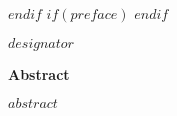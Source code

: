 \documentclass[12pt,letterpaper,oneside]{report}
\begin{document}
 \def\ackhead{\chapter*{Acknowledgements}
  \addcontentsline{toc}{chapter}{Acknowledgements}
  \addtocontents{toc}{\protect\addvspace{10\p@}}
 }
 \def\acktail{\par \null\vspace*{.75in}\hspace*{3in} \@author \newpage} 
$endif$
$if(preface)$
\newenvironment{preface}{
\chapter*{Preface}     
\addcontentsline{toc}{chapter}{Preface}
\addtocontents{toc}{\protect\addvspace{10\p@}}
}{}
$endif$
    \thispagestyle{plain}
    \noindent $designator$
    \begin{center}
	\large\bfseries Abstract
    \end{center}
    \vspace{2em}
    $abstract$
    \newpage
\tableofcontents
\newpage
\listoftables
\newpage
\listoffigures
\newpage
\date{$date$}
% 
% 
\end{document}

